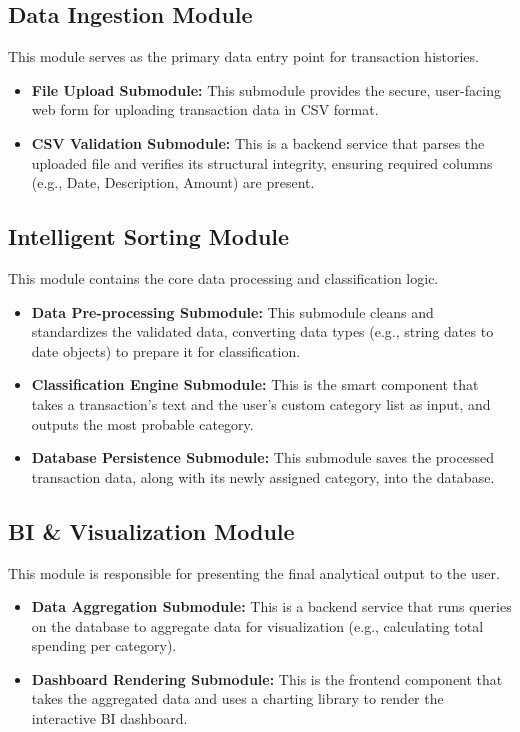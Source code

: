 \documentclass[11pt,a4paper]{report}
\begin{document}
\subsection{Data Ingestion Module}
This module serves as the primary data entry point for transaction histories.
\begin{itemize}
	\item \textbf{File Upload Submodule:} This submodule provides the secure, user-facing web form for uploading transaction data in CSV format.
	\item \textbf{CSV Validation Submodule:} This is a backend service that parses the uploaded file and verifies its structural integrity, ensuring required columns (e.g., Date, Description, Amount) are present.
\end{itemize}

\subsection{Intelligent Sorting Module}
This module contains the core data processing and classification logic.
\begin{itemize}
	\item \textbf{Data Pre-processing Submodule:} This submodule cleans and standardizes the validated data, converting data types (e.g., string dates to date objects) to prepare it for classification.
	\item \textbf{Classification Engine Submodule:} This is the smart component that takes a transaction's text and the user's custom category list as input, and outputs the most probable category.
	\item \textbf{Database Persistence Submodule:} This submodule saves the processed transaction data, along with its newly assigned category, into the database.
\end{itemize}

\subsection{BI \& Visualization Module}
This module is responsible for presenting the final analytical output to the user.
\begin{itemize}
	\item \textbf{Data Aggregation Submodule:} This is a backend service that runs queries on the database to aggregate data for visualization (e.g., calculating total spending per category).
	\item \textbf{Dashboard Rendering Submodule:} This is the frontend component that takes the aggregated data and uses a charting library to render the interactive BI dashboard.
\end{itemize}
\end{document}
